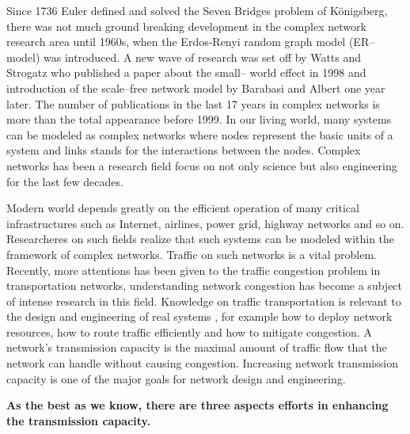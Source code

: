 \documentclass[onecolumn,preprintnumbers,amsmath,amssymb]{revtex4}
\begin{document}
Since 1736 Euler defined and solved the Seven Bridges problem of Königsberg, there was not much ground breaking development in the complex network research area until 1960s, when the Erdos-Renyi random graph model (ER–model) was introduced. A new wave of research was set off by Watts and Strogatz who published a paper about the small– world effect in 1998 and introduction of the scale–free network model by Barabasi and Albert one year later. The number of publications in the last 17 years in complex networks is more than the total appearance before 1999. In our living world, many systems can be modeled as complex networks where nodes represent the basic units of a system and links stands for the interactions between the nodes\cite{TFWN}. Complex networks has been a research field focus on not only science but also engineering for the last few decades\cite{PSV,AEM,KIG,BTS,LZYC,HHM,RAA,SND,MEJ,SBV}.



Modern world depends greatly on the efficient operation of many critical infrastructures such as Internet, airlines, power grid, highway networks and so on\cite{TCIC}. Researcheres on such fields realize that such systems can be modeled within the framework of complex networks. Traffic on such networks is a vital problem. Recently, more attentions has been given to the traffic congestion problem in transportation networks, understanding network congestion has become a subject of intense research in this field. Knowledge on traffic transportation is relevant to the design and engineering of real systems , for example how to deploy network
resources, how to route traffic efficiently and how to mitigate congestion. A network’s transmission capacity is the maximal amount of traffic flow that the network can handle without causing congestion\cite{TORS}. Increasing network transmission capacity is one of the major goals for network design and engineering.


{\bf As the best as we know, there are three aspects efforts in  enhancing the transmission capacity.}
\end{document}
